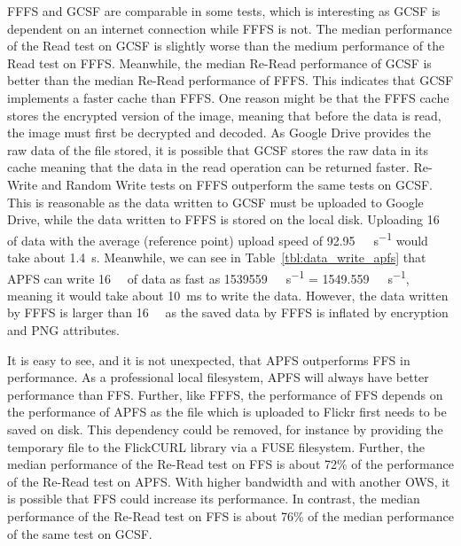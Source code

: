 FFFS and GCSF are comparable in some tests, which is interesting as GCSF is dependent on an internet connection while FFFS is not. The median performance of the Read test on GCSF is slightly worse than the medium performance of the Read test on FFFS. Meanwhile, the median Re-Read performance of GCSF is better than the median Re-Read performance of FFFS. This indicates that GCSF implements a faster cache than FFFS. One reason might be that the FFFS cache stores the encrypted version of the image, meaning that before the data is read, the image must first be decrypted and decoded. As Google Drive provides the raw data of the file stored, it is possible that GCSF stores the raw data in its cache meaning that the data in the read operation can be returned faster. Re-Write and Random Write tests on FFFS outperform the same tests on GCSF. This is reasonable as the data written to GCSF must be uploaded to Google Drive, while the data written to FFFS is stored on the local disk. Uploading \SI{16}{\mega\byte} of data with the average (reference point) upload speed of \SI[per-mode = symbol]{92.95}{\mega\bit\per\second} would take about \SI{1.4}{\second}. Meanwhile, we can see in Table~\ref{tbl:data_write_apfs} that APFS can write \SI{16}{\mega\byte} of data as fast as \SI[per-mode = symbol]{1539559}{\kilo\byte\per\second} = \SI[per-mode = symbol]{1549.559}{\mega\byte\per\second}, meaning it would take about \SI{10}{\milli\second} to write the data. However, the data written by FFFS is larger than \SI{16}{\mega\byte} as the saved data by FFFS is inflated by encryption and PNG attributes.

It is easy to see, and it is not unexpected, that APFS outperforms FFS in performance. As a professional local filesystem, APFS will always have better performance than FFS. Further, like FFFS, the performance of FFS depends on the performance of APFS as the file which is uploaded to Flickr first needs to be saved on disk. This dependency could be removed, for instance by providing the temporary file to the FlickCURL library via a FUSE filesystem. Further, the median performance of the Re-Read test on FFS is about 72\% of the performance of the Re-Read test on APFS. With higher bandwidth and with another OWS, it is possible that FFS could increase its performance. In contrast, the median performance of the Re-Read test on FFS is about 76\% of the median performance of the same test on GCSF.